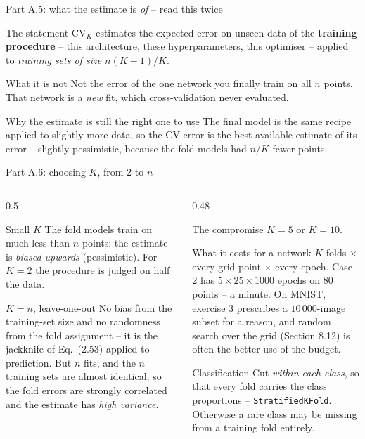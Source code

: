 \documentclass[10pt,aspectratio=169]{beamer}
\begin{document}
\begin{frame}{Part A.5: what the estimate is \emph{of} -- read this twice}
\small
\begin{block}{The statement}
$\mathrm{CV}_K$ estimates the expected error on unseen data of the
\textbf{training procedure} -- this architecture, these hyperparameters,
this optimiser -- applied to \emph{training sets of size $n(K-1)/K$}.
\end{block}
\begin{block}{What it is not}
Not the error of the one network you finally train on all $n$ points.
That network is a \emph{new} fit, which cross-validation never evaluated.
\end{block}
\begin{block}{Why the estimate is still the right one to use}
The final model is the same recipe applied to slightly more data, so the
CV error is the best available estimate of its error -- slightly
pessimistic, because the fold models had $n/K$ fewer points.
\end{block}
\end{frame}

\begin{frame}{Part A.6: choosing $K$, from $2$ to $n$}
\small
\begin{columns}[T]
\begin{column}{0.5\textwidth}
\begin{block}{Small $K$}
The fold models train on much less than $n$ points: the estimate is
\emph{biased upwards} (pessimistic).  For $K=2$ the procedure is judged on
half the data.
\end{block}
\begin{block}{$K=n$, leave-one-out}
No bias from the training-set size and no randomness from the fold
assignment -- it is the jackknife of Eq.~(2.53) applied to prediction.
But $n$ fits, and the $n$ training sets are almost identical, so the fold
errors are strongly correlated and the estimate has \emph{high
variance}.
\end{block}
\end{column}
\begin{column}{0.48\textwidth}
\begin{block}{The compromise}
$K=5$ or $K=10$.
\end{block}
\begin{block}{What it costs for a network}
$K$ folds $\times$ every grid point $\times$ every epoch.  Case 2 has
$5\times25\times1000$ epochs on $80$ points -- a minute.  On MNIST,
exercise 3 prescribes a $10\,000$-image subset for a reason, and random
search over the grid (Section 8.12) is often the better use of the budget.
\end{block}
\begin{block}{Classification}
Cut \emph{within each class}, so that every fold carries the class
proportions -- \texttt{StratifiedKFold}.  Otherwise a rare class may be
missing from a training fold entirely.
\end{block}
\end{column}
\end{columns}
\end{frame}
\end{document}
